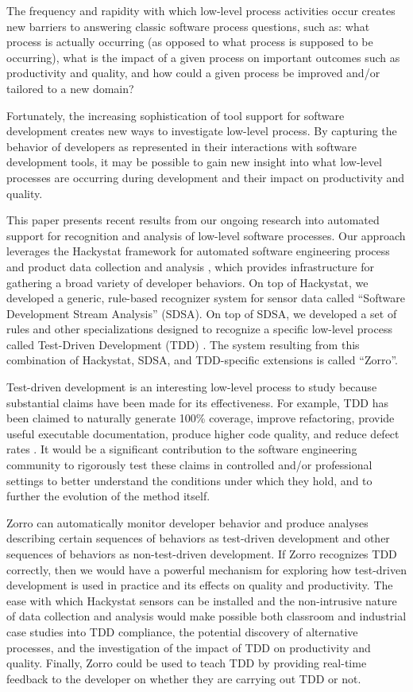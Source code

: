 \documentclass[runningheads]{llncs}
\begin{document}
The frequency and rapidity with which low-level process activities occur
creates new barriers to answering classic software process questions, such
as: what process is actually occurring (as opposed to what process is
supposed to be occurring), what is the impact of a given process on
important outcomes such as productivity and quality, and how could a given
process be improved and/or tailored to a new domain?

Fortunately, the increasing sophistication of tool support for software
development creates new ways to investigate low-level process.  By
capturing the behavior of developers as represented in their interactions
with software development tools, it may be possible to gain new insight
into what low-level processes are occurring during development and their 
impact on productivity and quality.

This paper presents recent results from our ongoing research into automated
support for recognition and analysis of low-level software processes. Our
approach leverages the Hackystat framework for automated software
engineering process and product data collection and analysis
\cite{Hackystat}, which provides infrastructure for gathering a broad
variety of developer behaviors.  On top of Hackystat, we developed a
generic, rule-based recognizer system for sensor data called ``Software
Development Stream Analysis'' (SDSA).  On top of SDSA, we developed a set
of rules and other specializations designed to recognize a specific
low-level process called Test-Driven Development (TDD) \cite{Beck:03}.  The
system resulting from this combination of Hackystat, SDSA, and TDD-specific
extensions is called ``Zorro''.

Test-driven development is an interesting low-level process to study
because substantial claims have been made for its effectiveness. For
example, TDD has been claimed to naturally generate 100\% coverage, improve
refactoring, provide useful executable documentation, produce higher code
quality, and reduce defect rates \cite{Beck:03,George:03,Maximilien:03}.
It would be a significant contribution to the software engineering
community to rigorously test these claims in controlled and/or professional
settings to better understand the conditions under which they hold, and to
further the evolution of the method itself.

Zorro can automatically monitor developer behavior and produce analyses
describing certain sequences of behaviors as test-driven development and
other sequences of behaviors as non-test-driven development.  If Zorro
recognizes TDD correctly, then we would have a powerful mechanism for
exploring how test-driven development is used in practice and its effects
on quality and productivity.  The ease with which Hackystat sensors can be
installed and the non-intrusive nature of data collection and analysis
would make possible both classroom and industrial case studies into TDD
compliance, the potential discovery of alternative processes, and the
investigation of the impact of TDD on productivity and quality.  Finally,
Zorro could be used to teach TDD by providing real-time feedback to the
developer on whether they are carrying out TDD or not.
\end{document}
